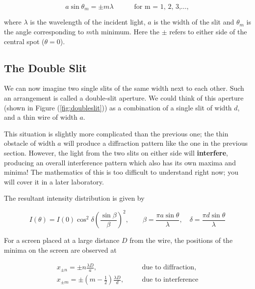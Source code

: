 \begin{equation}
   a \sin{\theta_m} = \pm m \lambda  \quad\quad\quad \text{for    m  = 1, 2, 3,}\hdots,
   \label{singleslit}
\end{equation}

where $\lambda$ is the wavelength of the incident light, $a$ is the width of the slit and $\theta_m$ is the angle corresponding to $m$th minimum. Here the $\pm$ refers to either side of the central spot ($\theta = 0$).


\subsection*{The Double Slit}

We can now imagine two single slits of the same width next to each other. Such an arrangement is called a double-slit aperture. We could think of this aperture (shown in Figure (\ref{fig:doubleslit})) as a combination of a single slit of width $d$, and a thin wire of width $a$. 

This situation is slightly more complicated than the previous one; the thin obstacle of width $a$ will produce a diffraction pattern like the one in the previous section. However, the light from the two slits on either side will \textbf{interfere}, producing an overall interference pattern which also has its own maxima and minima! The mathematics of this is too difficult to understand right now; you will cover it in a later laboratory.

The resultant intensity distribution is given by   

\begin{equation}
    I(\theta) = I(0) \cos^2\delta \left( \frac{\sin \beta}{\beta} \right)^2, \quad \quad  \beta = \frac{\pi a \sin \theta}{\lambda}, \quad \delta = \frac{\pi d \sin \theta}{\lambda}
\end{equation}

For a screen placed at a large distance $D$ from the wire, the positions of the minima on the screen are observed at 

\begin{equation}
    \begin{aligned}
        x_{\pm n} = \pm n \frac{\lambda D}{a}, &\quad& \text{due to diffraction},\\
        x_{\pm m} = \pm \left( m - \frac{1}{2}\right) \frac{\lambda D}{d}, &\quad& \text{due to interference}
    \end{aligned}
    \label{doubleslit}
\end{equation}



